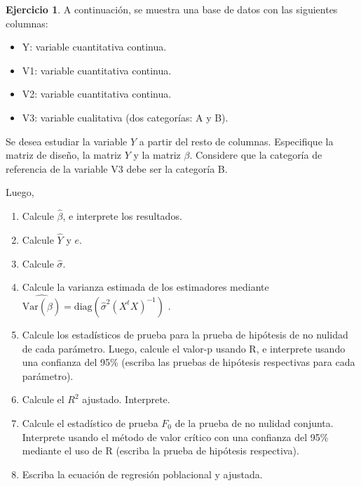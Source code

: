 \documentclass[
  11pt,
]{book}
\providecommand{\tightlist}{%
  \setlength{\itemsep}{0pt}\setlength{\parskip}{0pt}}
\theoremstyle{definition}
\theoremstyle{definition}
\theoremstyle{definition}
\newtheorem{exercise}{Ejercicio}[chapter]
\theoremstyle{definition}
\theoremstyle{remark}
\begin{document}
\begin{exercise}

A continuación, se muestra una base de datos con las siguientes columnas:

\begin{itemize}
\tightlist
\item
  Y: variable cuantitativa continua.
\item
  V1: variable cuantitativa continua.
\item
  V2: variable cuantitativa continua.
\item
  V3: variable cualitativa (dos categorías: A y B).
\end{itemize}

\begin{table}[H]
\centering
{}
\end{table}

Se desea estudiar la variable \(Y\) a partir del resto de columnas. Especifique la matriz de diseño, la matriz \(Y\) y la matriz \(\beta\). Considere que la categoría de referencia de la variable V3 debe ser la categoría B.

Luego,

\begin{enumerate}
\def\labelenumi{\arabic{enumi}.}
\tightlist
\item
  Calcule \(\widehat\beta\), e interprete los resultados.
\item
  Calcule \(\widehat{Y}\) y \(e\).
\item
  Calcule \(\widehat\sigma\).
\item
  Calcule la varianza estimada de los estimadores mediante \(\widehat{\mathrm{Var}(\hat{\beta})} = \text{diag}(\widehat\sigma^2 (X^tX)^{-1})\) .
\item
  Calcule los estadísticos de prueba para la prueba de hipótesis de no nulidad de cada parámetro. Luego, calcule el valor-p usando R, e interprete usando una confianza del 95\% (escriba las pruebas de hipótesis respectivas para cada parámetro).
\item
  Calcule el \(R^2\) ajustado. Interprete.
\item
  Calcule el estadístico de prueba \(F_0\) de la prueba de no nulidad conjunta. Interprete usando el método de valor crítico con una confianza del 95\% mediante el uso de R (escriba la prueba de hipótesis respectiva).
\item
  Escriba la ecuación de regresión poblacional y ajustada.
\end{enumerate}

\end{exercise}
\end{document}
